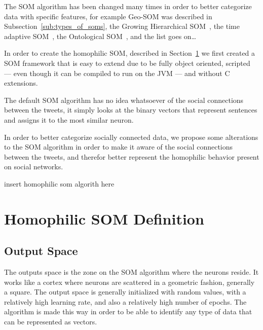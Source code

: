 The \ac{SOM} algorithm has been changed many times in order to better categorize data with specific features, for example Geo-SOM was described in Subsection~\ref{sub:types_of_soms}, the Growing Hierarchical SOM~\cite[]{1058070}, the time adaptive SOM~\cite[]{1187438}, the Ontological SOM~\cite[]{5446427}, and the list goes on\dots  

In order to create the homophilic SOM, described in Section~\ref{sec:algorithm_changes} we first created a SOM framework that is easy to extend due to be fully object oriented, scripted --- even though it can be compiled to run on the JVM --- and without C extensions.



The default \ac{SOM} algorithm has no idea whatsoever of the social connections between the tweets, it simply looks at the binary vectors that represent sentences and assigns it to the most similar neuron.

In order to better categorize socially connected data, we propose some alterations to the \ac{SOM} algorithm in order to make it aware of the social connections between the tweets, and therefor better represent the homophilic behavior present on social networks.

{\color{red} insert homophilic som algorith here}

\section{Homophilic SOM Definition}
\label{sec:algorithm_changes}

\subsection{Output Space}
\label{sub:output_space}
The outputs space is the zone on the \ac{SOM} algorithm where the neurons reside. It works like a cortex where neurons are scattered in a geometric fashion, generally a square. The output space is generally initialized with random values, with a relatively high learning rate, and also a relatively high number of epochs. The algorithm is made this way in order to be able to identify any type of data that can be represented as vectors.

